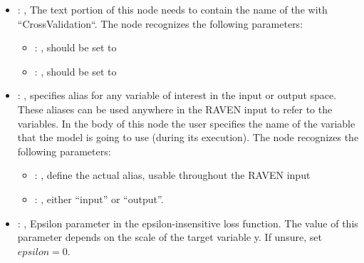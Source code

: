 \begin{itemize}
\begin{itemize}
        \item {}: ,
          List of IDs of features/variables to include in the transformation process.

        \item {}: ,
          Which space to search? Target or Feature?
      \end{itemize}

    \item {}: ,
      The text portion of this node needs to contain the name of the  with
               ``CrossValidation``.
      The  node recognizes the following parameters:
        \begin{itemize}
          \item {}: ,
            should be set to 
          \item {}: ,
            should be set to 
      \end{itemize}

    \item {}: ,
      specifies alias for         any variable of interest in the input or output space. These
      aliases can be used anywhere in the RAVEN input to         refer to the variables. In the body
      of this node the user specifies the name of the variable that the model is going to use
      (during its execution).
      The  node recognizes the following parameters:
        \begin{itemize}
          \item {}: ,
            define the actual alias, usable throughout the RAVEN input
          \item {}: ,
            either ``input'' or ``output''.
      \end{itemize}

    \item {}: ,
      Epsilon parameter in the epsilon-insensitive loss function. The value of
      this parameter depends on the scale of the target variable y. If unsure, set $epsilon=0.$


\end{itemize}
